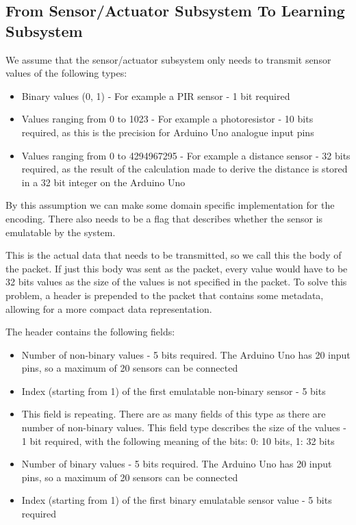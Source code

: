 \subsection{From Sensor/Actuator Subsystem To Learning Subsystem}
We assume that the sensor/actuator subsystem only needs to transmit sensor values of the following types:

\begin{itemize}
\item Binary values (0, 1) - For example a PIR sensor - 1 bit required
\item Values ranging from 0 to 1023 - For example a photoresistor - 10 bits required, as this is the precision for Arduino Uno analogue input pins
\item Values ranging from 0 to 4294967295 - For example a distance sensor - 32 bits required, as the result of the calculation made to derive the distance is stored in a 32 bit integer on the Arduino Uno
\end{itemize}
By this assumption we can make some domain specific implementation for the encoding.
There also needs to be a flag that describes whether the sensor is emulatable by the system.

This is the actual data that needs to be transmitted, so we call this the body of the packet. If just this body was sent as the packet, every value would have to be 32 bits values as the size of the values is not specified in the packet. To solve this problem, a header is prepended to the packet that contains some metadata, allowing for a more compact data representation.

The header contains the following fields:

\begin{itemize}
\item Number of non-binary values - 5 bits required. The Arduino Uno has 20 input pins, so a maximum of 20 sensors can be connected
\item Index (starting from 1) of the first emulatable non-binary sensor - 5 bits
\item This field is repeating. There are as many fields of this type   as there are number of non-binary values. This field type describes
the size of the values - 1 bit required, with the following meaning of the bits: 0: 10 bits, 1: 32 bits
\item Number of binary values - 5 bits required. The Arduino Uno has 20 input pins, so a maximum of 20 sensors can be connected
\item Index (starting from 1) of the first binary emulatable sensor value - 5 bits required
\end{itemize}

